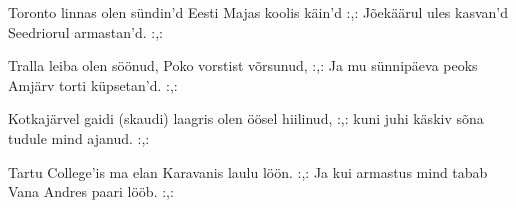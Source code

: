 Toronto linnas olen s\"undin'd
Eesti Majas koolis k\"ain'd
:,: J\~oek\"a\"arul ules kasvan'd
Seedriorul armastan'd. :,:

Tralla leiba olen s\"o\"onud,
Poko vorstist v\~orsunud,
:,: Ja mu s\"unnip\"aeva peoks
Amj\"arv torti k\"upsetan'd. :,:

Kotkaj\"arvel gaidi (skaudi) laagris
olen \"o\"osel hiilinud,
:,: kuni juhi k\"askiv s\~ona
tudule mind ajanud. :,:

Tartu College'is ma elan
Karavanis laulu l\"o\"on.
:,: Ja kui armastus mind tabab
Vana Andres paari l\"o\"ob. :,: